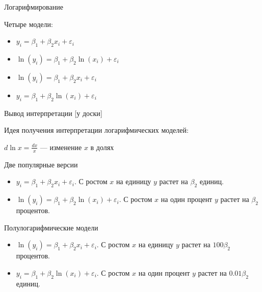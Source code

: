 \documentclass[russian,ignorenonframetext,]{beamer}
\begin{document}
\begin{frame}{Логарифмирование}

Четыре модели:

\begin{itemize}
\item
  \(y_i = \beta_1 + \beta_2 x_i + \varepsilon_i\)
\item
  \(\ln( y_i) = \beta_1 + \beta_2 \ln( x_i) + \varepsilon_i\)
\item
  \(\ln( y_i) = \beta_1 + \beta_2 x_i + \varepsilon_i\)
\item
  \(y_i = \beta_1 + \beta_2 \ln( x_i) + \varepsilon_i\)
\end{itemize}

\end{frame}

\begin{frame}{Вывод интерпретации {[}у доски{]}}

Идея получения интерпретации логарифмических моделей:

\(d \ln x= \frac{dx}{x}\) --- изменение \(x\) в долях

\end{frame}

\begin{frame}{Две популярные версии}

\begin{itemize}
\item
  \(y_i = \beta_1 + \beta_2 x_i + \varepsilon_i\). С ростом \(x\) на
  единицу \(y\) растет на \(\beta_2\) единиц.
\item
  \(\ln( y_i) = \beta_1 + \beta_2 \ln( x_i) + \varepsilon_i\). С ростом
  \(x\) на один процент \(y\) растет на \(\beta_2\) процентов.
\end{itemize}

\end{frame}

\begin{frame}{Полулогарифмические модели}

\begin{itemize}
\item
  \(\ln( y_i) = \beta_1 + \beta_2 x_i + \varepsilon_i\). С ростом \(x\)
  на единицу \(y\) растет на \(100\beta_2\) процентов.
\item
  \(y_i = \beta_1 + \beta_2 \ln( x_i) + \varepsilon_i\). С ростом \(x\)
  на один процент \(y\) растет на \(0.01\beta_2\) единиц.
\end{itemize}

\end{frame}
\end{document}
